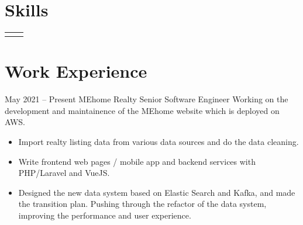 \documentclass[
	10pt, %
]{FreemanCV}
\begin{document}
\begin{paracol}{2}
\section{Skills}




\begin{supertabular}{r l} %


\end{supertabular}

\medskip %



\section{Work Experience}





\jobentry
	{May 2021 -- Present} %
	{} %
	{MEhome Realty} %
	{Senior Software Engineer} %
	{Working on the development and maintainence of the MEhome website which is deployed on AWS.} %
	\begin{itemize}
        \item Import realty listing data from various data sources and do the data cleaning.
        \item Write frontend web pages / mobile app and backend services with PHP/Laravel and VueJS.
        \item Designed the new data system based on Elastic Search and Kafka, and made the transition plan. Pushing through the refactor of the data system, improving the performance and user experience.
    \end{itemize}


\end{paracol}
\end{document}
